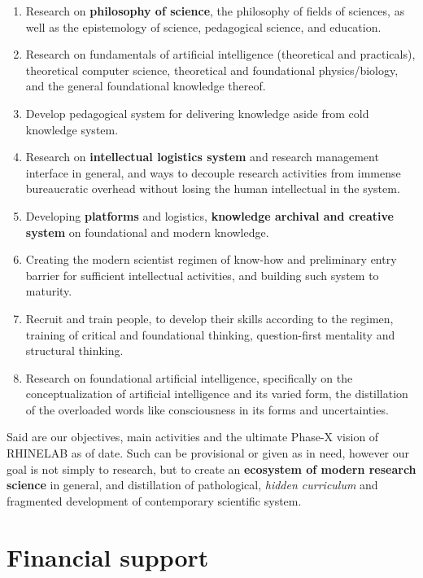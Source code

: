 \documentclass[10pt,a4paper]{article}
\begin{document}
\begin{enumerate}[topsep=0pt,itemsep=0pt]
    \item Research on \textbf{philosophy of science}, the philosophy of fields of sciences, as well as the epistemology of science, pedagogical science, and education. 
    \item Research on fundamentals of artificial intelligence (theoretical and practicals), theoretical computer science, theoretical and foundational physics/biology, and the general foundational knowledge thereof. 
    \item Develop pedagogical system for delivering knowledge aside from cold knowledge system. 
    \item Research on \textbf{intellectual logistics system} and research management interface in general, and ways to decouple research activities from immense bureaucratic overhead without losing the human intellectual in the system. 
    \item Developing \textbf{platforms} and logistics, \textbf{knowledge archival and creative system} on foundational and modern knowledge. 
    \item Creating the modern scientist regimen of know-how and preliminary entry barrier for sufficient intellectual activities, and building such system to maturity. 
    \item Recruit and train people, to develop their skills according to the regimen, training of critical and foundational thinking, question-first mentality and structural thinking. 
    \item Research on foundational artificial intelligence, specifically on the conceptualization of artificial intelligence and its varied form, the distillation of the overloaded words like consciousness in its forms and uncertainties. 
\end{enumerate}

Said are our objectives, main activities and the ultimate Phase-X vision of RHINELAB as of date. Such can be provisional or given as in need, however our goal is not simply to research, but to create an \textbf{ecosystem of modern research science} in general, and distillation of pathological, \textit{hidden curriculum} and fragmented development of contemporary scientific system. 

\section{Financial support}
\end{document}
